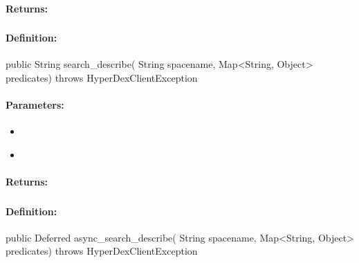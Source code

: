 \paragraph{Returns:}


\pagebreak
\subsubsection{}
\label{api:java:search_describe}


\paragraph{Definition:}
\begin{javacode}
public String search_describe(
        String spacename,
        Map<String, Object> predicates) throws HyperDexClientException
\end{javacode}

\paragraph{Parameters:}
\begin{itemize}[noitemsep]
\item {}\\

\item {}\\

\end{itemize}

\paragraph{Returns:}


\pagebreak
\subsubsection{}
\label{api:java:async_search_describe}


\paragraph{Definition:}
\begin{javacode}
public Deferred async_search_describe(
        String spacename,
        Map<String, Object> predicates) throws HyperDexClientException
\end{javacode}

